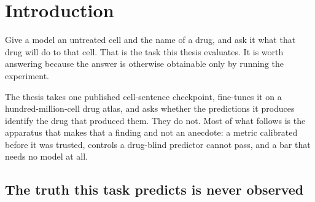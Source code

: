 %
%
%

\chapter{Introduction}
\label{sec:introduction}

\noindent
Give a model an untreated cell and the name of a drug, and ask it what that
drug will do to that cell. That is the task this thesis evaluates. It is worth
answering because the answer is otherwise obtainable only by running the
experiment.

The thesis takes one published cell-sentence checkpoint, fine-tunes it on a
hundred-million-cell drug atlas, and asks whether the predictions it produces
identify the drug that produced them. They do not. Most of what follows is the
apparatus that makes that a finding and not an anecdote: a metric calibrated
before it was trusted, controls a drug-blind predictor cannot pass, and a bar
that needs no model at all.

\section{The truth this task predicts is never observed}
\label{sec:intro-task}

